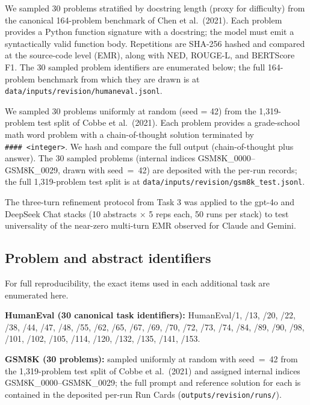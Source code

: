 \documentclass[11pt]{article}
\begin{document}
\begin{description}[leftmargin=*]
  \item[\textbf{HumanEval (code generation)}.] We sampled 30 problems stratified by docstring length (proxy for difficulty) from the canonical 164-problem benchmark of Chen et al.\ (2021). Each problem provides a Python function signature with a docstring; the model must emit a syntactically valid function body. Repetitions are SHA-256 hashed and compared at the source-code level (EMR), along with NED, ROUGE-L, and BERTScore F1. The 30 sampled problem identifiers are enumerated below; the full 164-problem benchmark from which they are drawn is at \texttt{data/inputs/revision/humaneval.jsonl}.
  \item[\textbf{GSM8K (math reasoning)}.] We sampled 30 problems uniformly at random (seed = 42) from the 1{,}319-problem test split of Cobbe et al.\ (2021). Each problem provides a grade-school math word problem with a chain-of-thought solution terminated by \texttt{\#\#\#\#\ <integer>}. We hash and compare the full output (chain-of-thought plus answer). The 30 sampled problems (internal indices GSM8K\_0000--GSM8K\_0029, drawn with seed~=~42) are deposited with the per-run records; the full 1{,}319-problem test split is at \texttt{data/inputs/revision/gsm8k\_test.jsonl}.
  \item[\textbf{Multi-turn extension to gpt-4o and DeepSeek Chat}.] The three-turn refinement protocol from Task 3 was applied to the gpt-4o and DeepSeek Chat stacks (10 abstracts $\times$ 5 reps each, 50 runs per stack) to test universality of the near-zero multi-turn EMR observed for Claude and Gemini.
\end{description}

\subsection{Problem and abstract identifiers}

For full reproducibility, the exact items used in each additional task are enumerated here.

\textbf{HumanEval (30 canonical task identifiers):}
HumanEval/1, /13, /20, /22, /38, /44, /47, /48, /55, /62, /65, /67, /69, /70, /72, /73, /74, /84, /89, /90, /98, /101, /102, /105, /114, /120, /132, /135, /141, /153.

\textbf{GSM8K (30 problems):} sampled uniformly at random with seed~=~42 from the 1{,}319-problem test split of Cobbe et al.\ (2021) and assigned internal indices GSM8K\_0000--GSM8K\_0029; the full prompt and reference solution for each is contained in the deposited per-run Run Cards (\texttt{outputs/revision/runs/}).
\end{document}
